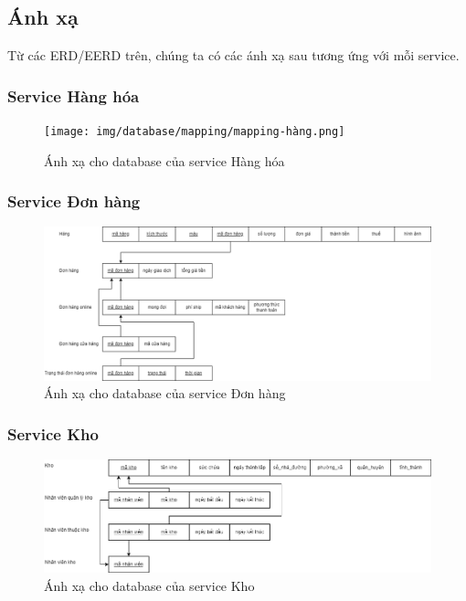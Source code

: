 \subsection{Ánh xạ}
\par Từ các ERD/EERD trên, chúng ta có các ánh xạ sau tương ứng với mỗi service.

\subsubsection{Service Hàng hóa}
\begin{figure}[!htp]
    \begin{center}
        \texttt{[image: img/database/mapping/mapping-hàng.png]}
        \newline
        \caption{Ánh xạ cho database của service Hàng hóa}
    \end{center}
\end{figure}

\subsubsection{Service Đơn hàng}
\begin{figure}[!htp]
    \begin{center}
        \includegraphics[width=1\textwidth]{img/database/mapping/mapping-đơnhàng.png}
        \newline
        \caption{Ánh xạ cho database của service Đơn hàng}
    \end{center}
\end{figure}

\subsubsection{Service Kho}
\begin{figure}[!htp]
    \begin{center}
        \includegraphics[width=1\textwidth]{img/database/mapping/mapping-kho.png}
        \newline
        \caption{Ánh xạ cho database của service Kho}
    \end{center}
\end{figure}